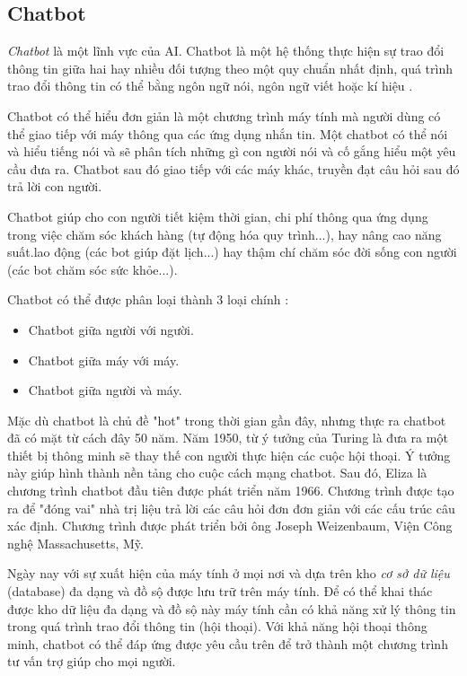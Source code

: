 \subsection{Chatbot}
\textit{Chatbot} là một lĩnh vực của AI. Chatbot là một hệ thống thực hiện sự trao đổi thông tin giữa hai hay nhiều đối tượng theo một quy chuẩn nhất định, quá trình trao đổi thông tin có thể bằng ngôn ngữ nói, ngôn ngữ viết hoặc kí hiệu \cite{hoang2011ung}.\par
Chatbot có thể hiểu đơn giản là một chương trình máy tính mà người dùng có thể giao tiếp với máy thông qua các ứng dụng nhắn tin. Một chatbot có thể nói và hiểu tiếng nói và sẽ phân tích những gì con người nói và cố gắng hiểu một yêu cầu đưa ra. Chatbot sau đó giao tiếp với các máy khác, truyền đạt câu hỏi sau đó trả lời con người.\par
Chatbot giúp cho con người tiết kiệm thời gian, chi phí thông qua ứng dụng trong việc chăm sóc khách hàng (tự động hóa quy trình...), hay nâng cao năng suất.lao động (các bot giúp đặt lịch...) hay thậm chí chăm sóc đời sống con người (các bot chăm sóc sức khỏe...).\par
Chatbot có thể được phân loại thành 3 loại chính \cite{hoang2011ung}:
\begin{itemize}
	\item Chatbot giữa người với người.
	\item Chatbot giữa máy với máy.
	\item Chatbot giữa người và máy.
\end{itemize}\par
Mặc dù chatbot là chủ đề "hot" trong thời gian gần đây, nhưng thực ra chatbot đã có mặt từ cách đây 50 năm. Năm 1950, từ ý tưởng của Turing là đưa ra một thiết bị thông minh sẽ thay thế con người thực hiện các cuộc hội thoại. Ý tưởng này giúp hình thành nền tảng cho cuộc cách mạng chatbot. Sau đó, Eliza là chương trình chatbot đầu tiên được phát triển năm 1966. Chương trình được tạo ra để "đóng vai" nhà trị liệu trả lời các câu hỏi đơn đơn giản với các cấu trúc câu xác định. Chương trình được phát triển bởi ông Joseph Weizenbaum, Viện Công nghệ Massachusetts, Mỹ.\par
Ngày nay với sự xuất hiện của máy tính ở mọi nơi và dựa trên kho \textit{cơ sở dữ liệu} (database) đa dạng và đồ sộ được lưu trữ trên máy tính. Để có thể khai thác được kho dữ liệu đa dạng và đồ sộ này máy tính cần có khả năng xử lý thông tin trong quá trình trao đổi thông tin (hội thoại). Với khả năng hội thoại thông minh, chatbot có thể đáp ứng được yêu cầu trên để trở thành một chương trình tư vấn trợ giúp cho mọi người.\par

